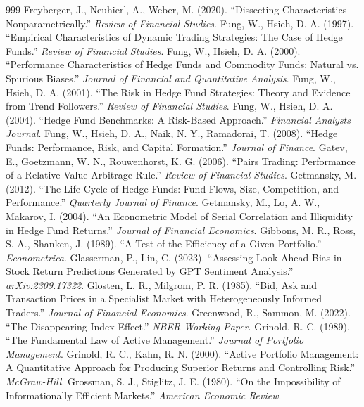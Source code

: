 \begin{thebibliography}{999}
 Freyberger, J., Neuhierl, A., Weber, M. (2020). ``Dissecting Characteristics Nonparametrically.'' \textit{Review of Financial Studies}.
 Fung, W., Hsieh, D. A. (1997). ``Empirical Characteristics of Dynamic Trading Strategies: The Case of Hedge Funds.'' \textit{Review of Financial Studies}.
 Fung, W., Hsieh, D. A. (2000). ``Performance Characteristics of Hedge Funds and Commodity Funds: Natural vs. Spurious Biases.'' \textit{Journal of Financial and Quantitative Analysis}.
 Fung, W., Hsieh, D. A. (2001). ``The Risk in Hedge Fund Strategies: Theory and Evidence from Trend Followers.'' \textit{Review of Financial Studies}.
 Fung, W., Hsieh, D. A. (2004). ``Hedge Fund Benchmarks: A Risk-Based Approach.'' \textit{Financial Analysts Journal}.
 Fung, W., Hsieh, D. A., Naik, N. Y., Ramadorai, T. (2008). ``Hedge Funds: Performance, Risk, and Capital Formation.'' \textit{Journal of Finance}.
 Gatev, E., Goetzmann, W. N., Rouwenhorst, K. G. (2006). ``Pairs Trading: Performance of a Relative-Value Arbitrage Rule.'' \textit{Review of Financial Studies}.
 Getmansky, M. (2012). ``The Life Cycle of Hedge Funds: Fund Flows, Size, Competition, and Performance.'' \textit{Quarterly Journal of Finance}.
 Getmansky, M., Lo, A. W., Makarov, I. (2004). ``An Econometric Model of Serial Correlation and Illiquidity in Hedge Fund Returns.'' \textit{Journal of Financial Economics}.
 Gibbons, M. R., Ross, S. A., Shanken, J. (1989). ``A Test of the Efficiency of a Given Portfolio.'' \textit{Econometrica}.
 Glasserman, P., Lin, C. (2023). ``Assessing Look-Ahead Bias in Stock Return Predictions Generated by GPT Sentiment Analysis.'' \textit{arXiv:2309.17322}.
 Glosten, L. R., Milgrom, P. R. (1985). ``Bid, Ask and Transaction Prices in a Specialist Market with Heterogeneously Informed Traders.'' \textit{Journal of Financial Economics}.
 Greenwood, R., Sammon, M. (2022). ``The Disappearing Index Effect.'' \textit{NBER Working Paper}.
 Grinold, R. C. (1989). ``The Fundamental Law of Active Management.'' \textit{Journal of Portfolio Management}.
 Grinold, R. C., Kahn, R. N. (2000). ``Active Portfolio Management: A Quantitative Approach for Producing Superior Returns and Controlling Risk.'' \textit{McGraw-Hill}.
 Grossman, S. J., Stiglitz, J. E. (1980). ``On the Impossibility of Informationally Efficient Markets.'' \textit{American Economic Review}.

\end{thebibliography}
